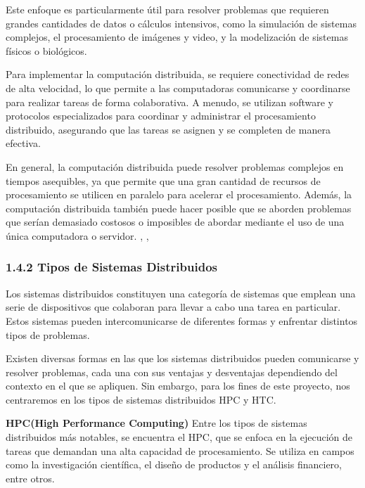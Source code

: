 \begin{doublespace}
\begin{multicols}{2}
  Este enfoque es particularmente útil para resolver problemas que requieren grandes cantidades de datos o cálculos intensivos, como la simulación de sistemas complejos, el procesamiento de imágenes y video, y la modelización de sistemas físicos o biológicos.

  Para implementar la computación distribuida, se requiere conectividad de redes de alta velocidad, lo que permite a las computadoras comunicarse y coordinarse para realizar tareas de forma colaborativa. A menudo, se utilizan software y protocolos especializados para coordinar y administrar el procesamiento distribuido, asegurando que las tareas se asignen y se completen de manera efectiva.

  En general, la computación distribuida puede resolver problemas complejos en tiempos asequibles, ya que permite que una gran cantidad de recursos de procesamiento se utilicen en paralelo para acelerar el procesamiento. Además, la computación distribuida también puede hacer posible que se aborden problemas que serían demasiado costosos o imposibles de abordar mediante el uso de una única computadora o servidor. \cite{distributed-1}, \cite{distributed-4}, \cite{distributed-3}

  \subsubsection{1.4.2 Tipos de Sistemas Distribuidos}

  Los sistemas distribuidos constituyen una categoría de sistemas que emplean una serie de dispositivos que colaboran para llevar a cabo una tarea en particular. Estos sistemas pueden intercomunicarse de diferentes formas y enfrentar distintos tipos de problemas.

  Existen diversas formas en las que los sistemas distribuidos pueden comunicarse y resolver problemas, cada una con sus ventajas y desventajas dependiendo del contexto en el que se apliquen. Sin embargo, para los fines de este proyecto, nos centraremos en los tipos de sistemas distribuidos HPC y HTC.
  \vspace{3mm}

  \textbf{HPC(High Performance Computing)}  
  \newline
  Entre los tipos de sistemas distribuidos más notables, se encuentra el HPC, que se enfoca en la ejecución de tareas que demandan una alta capacidad de procesamiento. Se utiliza en campos como la investigación científica, el diseño de productos y el análisis financiero, entre otros.


\end{multicols}
\end{doublespace}
